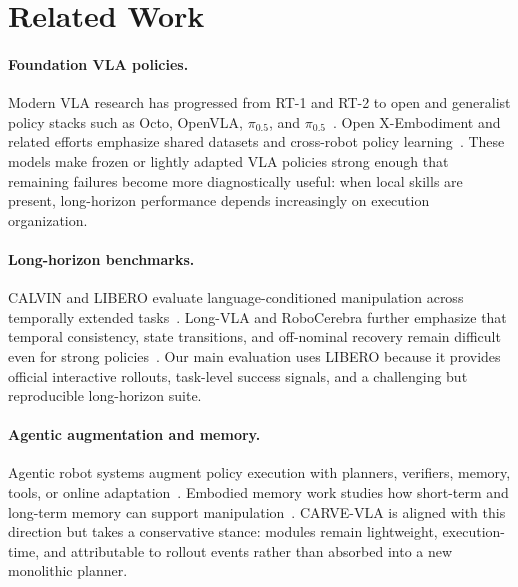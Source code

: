 \documentclass[runningheads]{waica}
\newcommand{\method}{CARVE-VLA}
\newcommand{\pizero}{$\pi_{0.5}$}
\begin{document}
\section{Related Work}
\label{sec:related}

\paragraph{Foundation VLA policies.}
Modern VLA research has progressed from RT-1 and RT-2 to open and generalist policy stacks such as Octo, OpenVLA, \pizero{}, and \pizero{}~\cite{brohan2022rt1,brohan2023rt2,octo2024octo,kim2024openvla,black2024pi0,physicalintelligence2025pi05}.
Open X-Embodiment and related efforts emphasize shared datasets and cross-robot policy learning~\cite{oneill2023openx}.
These models make frozen or lightly adapted VLA policies strong enough that remaining failures become more diagnostically useful: when local skills are present, long-horizon performance depends increasingly on execution organization.

\paragraph{Long-horizon benchmarks.}
CALVIN and LIBERO evaluate language-conditioned manipulation across temporally extended tasks~\cite{mees2021calvin,liu2023libero}.
Long-VLA and RoboCerebra further emphasize that temporal consistency, state transitions, and off-nominal recovery remain difficult even for strong policies~\cite{fan2025longvla,han2025robocerebra}.
Our main evaluation uses LIBERO because it provides official interactive rollouts, task-level success signals, and a challenging but reproducible long-horizon suite.

\paragraph{Agentic augmentation and memory.}
Agentic robot systems augment policy execution with planners, verifiers, memory, tools, or online adaptation~\cite{yang2025agenticrobot,li2026roboclaw,pang2026scivla,jin2026agenticvla}.
Embodied memory work studies how short-term and long-term memory can support manipulation~\cite{torne2026mem,shi2025memoryvla}.
\method{} is aligned with this direction but takes a conservative stance: modules remain lightweight, execution-time, and attributable to rollout events rather than absorbed into a new monolithic planner.
\end{document}
